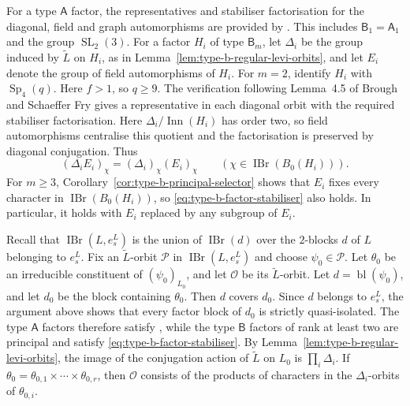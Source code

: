 \documentclass[10pt]{amsart}
\theoremstyle{definition}
\renewcommand{\geq}{\geqslant}
\let\oldendproof\endproof
\renewenvironment{proof}[1][\proofname]{%
  \oldproof[\bfseries #1]%
}{\oldendproof}
\DeclareMathOperator{\Inn}{Inn}
\DeclareMathOperator{\IBr}{IBr}
\DeclareMathOperator{\Sp}{Sp}
\DeclareMathOperator{\bl}{bl}
\numberwithin{equation}{section}
\numberwithin{table}{section}
\begin{document}
\begin{proof}
For a type $\mathsf A$ factor, the representatives and stabiliser
factorisation for the diagonal, field and graph automorphisms are
provided by \cite[Theorem~8.1]{FengLiZhang2021Equivariant}.
This includes $\mathsf B_1=\mathsf A_1$ and the group
$\operatorname{SL}_2(3)$.
For a factor $H_i$ of type $\mathsf B_m$, let $\Delta_i$ be the
group induced by $\widetilde L$ on $H_i$, as in
Lemma~\ref{lem:type-b-regular-levi-orbits}, and let $E_i$ denote
the group of field automorphisms of $H_i$.
For $m=2$, identify $H_i$ with $\Sp_4(q)$.
Here $f>1$, so $q\geq9$.
The verification following Lemma~4.5 of Brough and Schaeffer Fry
\cite[p.~1203]{BroughSchaefferFry2020} gives a representative in each
diagonal orbit with the required stabiliser factorisation.
Here $\Delta_i/\Inn(H_i)$ has order two, so field automorphisms
centralise this quotient and the factorisation is preserved by
diagonal conjugation. Thus
\begin{equation}\label{eq:type-b-factor-stabiliser}
 (\Delta_i E_i)_\chi=(\Delta_i)_\chi(E_i)_\chi
 \qquad(\chi\in\IBr(B_0(H_i))).
\end{equation}
For $m\geq3$, Corollary~\ref{cor:type-b-principal-selector} shows
that $E_i$ fixes every character in $\IBr(B_0(H_i))$, so
\eqref{eq:type-b-factor-stabiliser} also holds. In particular, it holds
with $E_i$ replaced by any subgroup of $E_i$.

Recall that $\IBr(L,e_s^L)$ is the union of $\IBr(d)$ over the
$2$-blocks $d$ of $L$ belonging to $e_s^L$.
Fix an $\widetilde L$-orbit $\mathcal P$ in $\IBr(L,e_s^L)$ and choose
$\psi_0\in\mathcal P$. Let $\theta_0$ be an irreducible constituent
of $(\psi_0)_{L_0}$, and let $\mathcal O$ be its $\widetilde L$-orbit.
Let $d=\bl(\psi_0)$, and let $d_0$ be the block containing $\theta_0$.
Then $d$ covers $d_0$. Since $d$ belongs to $e_s^L$, the argument above
shows that every factor block of $d_0$ is strictly quasi-isolated.
The type $\mathsf A$ factors therefore satisfy
\cite[Theorem~8.1]{FengLiZhang2021Equivariant}, while the type
$\mathsf B$ factors of rank at least two are principal and satisfy
\eqref{eq:type-b-factor-stabiliser}.
By Lemma~\ref{lem:type-b-regular-levi-orbits}, the image of the
conjugation action of $\widetilde L$ on $L_0$ is $\prod_i\Delta_i$. If
$\theta_0=\theta_{0,1}\times\cdots\times\theta_{0,r}$, then
$\mathcal O$ consists of the products of characters in the
$\Delta_i$-orbits of $\theta_{0,i}$.


\end{proof}
\end{document}
